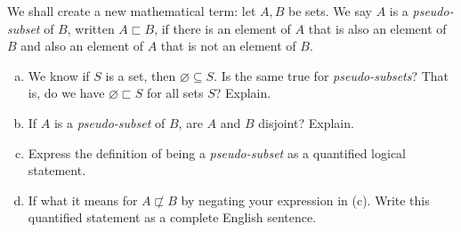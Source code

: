 \documentclass[11pt,letterpaper]{article}
\begin{document}
 We shall create a new mathematical term: let $A, B$ be sets. We say $A$ is a \textit{pseudo-subset} of $B$, written $A \sqsubset B$, if there is an element of $A$ that is also an element of $B$ and also an element of $A$ that is not an element of $B$. 
	\begin{enumerate}[(a)]
	\item We know if $S$ is a set, then $\varnothing \subseteq S$. Is the same true for \textit{pseudo-subsets}? That is, do we have $\varnothing \sqsubset S$ for all sets $S$? Explain. 
	\item If $A$ is a \textit{pseudo-subset} of $B$, are $A$ and $B$ disjoint? Explain. 
	\item Express the definition of being a \textit{pseudo-subset} as a quantified logical statement. 
	\item If what it means for $A \not\sqsubset B$ by negating your expression in (c). Write this quantified statement as a complete English sentence. 
	\end{enumerate} \pspace
\end{document}
